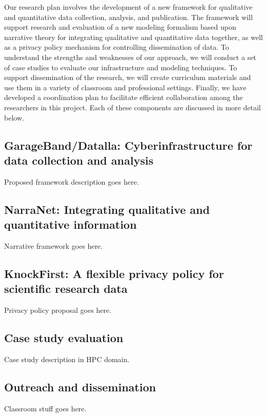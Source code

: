 Our research plan involves the development of a new framework for
qualitative and quantitative data collection, analysis, and publication.
The framework will support research and evaluation of a new modeling
formalism based upon narrative theory for integrating qualitative and
quantitative data together, as well as a privacy policy mechanism for
controlling dissemination of data.  To understand the strengths and
weaknesses of our approach, we will conduct a set of case studies to
evaluate our infrastructure and modeling techniques. To support
dissemination of the research, we will create curriculum materials and use
them in a variety of classroom and professional settings.  Finally, we have
developed a coordination plan to facilitate efficient collaboration among the 
researchers in this project. Each of these components are discussed in more detail below.

\subsection{GarageBand/Datalla: Cyberinfrastructure for data collection and analysis}

Proposed framework description goes here.

\subsection{NarraNet: Integrating qualitative and quantitative information}

Narrative framework goes here.

\subsection{KnockFirst: A flexible privacy policy for scientific research data}

Privacy policy proposal goes here.

\subsection{Case study evaluation}

Case study description in HPC domain.

\subsection{Outreach and dissemination}

Classroom stuff goes here.


